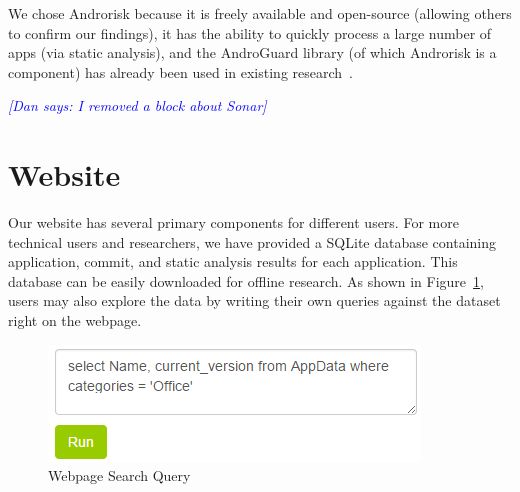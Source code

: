 \documentclass[journal,transmag]{IEEEtran}
\newcommand{\todo}[1]{\textcolor{cyan}{\textbf{[#1]}}}
\newcommand{\dan}[1]{\textcolor{blue}{{\it [Dan says: #1]}}}
\begin{document}
We chose Androrisk because it is freely available and open-source (allowing others to confirm our findings), it has the ability to quickly process a large number of apps (via static analysis), and the AndroGuard library (of which Androrisk is a component) has already been used in existing research~\cite{Egele:2013:ESC:2508859.2516693}.




\dan{I removed a block about Sonar}





\section{Website}
\label{sec: website}
%

Our website has several primary components for different users. For more technical users and researchers, we have provided a SQLite database containing application, commit, and static analysis results for each application. This database can be easily downloaded for offline research. As shown in Figure~\ref{fig:webpagequery}, users may also explore the data by writing their own queries against the dataset right on the webpage.

\begin{figure}[ht!]
\centering
\includegraphics[width=\columnwidth, angle = 0, scale=.8]{images/webpageQuery.png}
\caption{Webpage Search Query}
\label{fig:webpagequery}
\end{figure}
\end{document}
